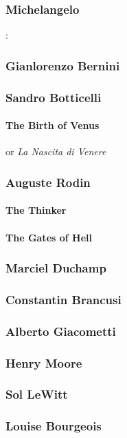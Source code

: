 		
			\subsubsection{Michelangelo}: 
			
			\subsubsection{Gianlorenzo Bernini}
			\subsubsection{Sandro Botticelli}
				\paragraph{The Birth of Venus} or \textit{La Nascita di Venere}
			\subsubsection{Auguste Rodin}
				\paragraph{The Thinker}
				\paragraph{The Gates of Hell}
			\subsubsection{Marciel Duchamp}
			\subsubsection{Constantin Brancusi}
			\subsubsection{Alberto Giacometti}
			\subsubsection{Henry Moore}
			\subsubsection{Sol LeWitt}
			\subsubsection{Louise Bourgeois}
			
